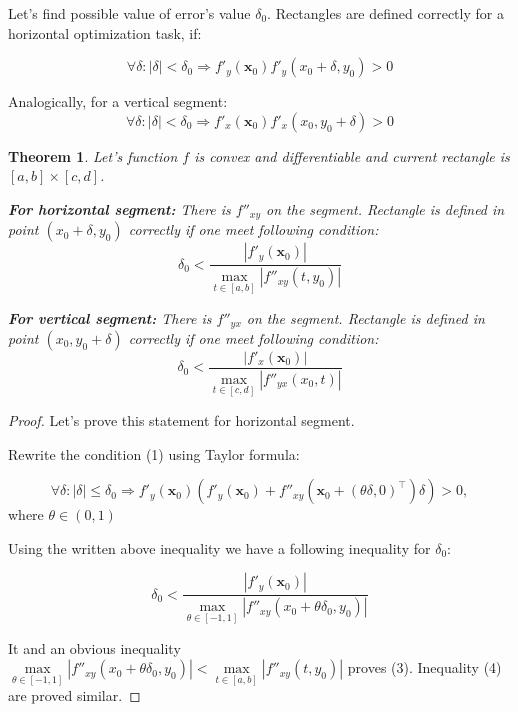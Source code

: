 \documentclass[12pt]{article}
\newtheorem{theorem}{Theorem}[section]
\begin{document}
Let's find possible value of error's value $\delta_0$. Rectangles are defined correctly for a horizontal optimization task, if:

\begin{equation}\label{1}
\forall\delta : |\delta| < \delta_0 \Rightarrow f'_y(\textbf{x}_0)f'_y(x_0+\delta, y_0) > 0
\end{equation}

Analogically, for a vertical segment:
\begin{equation}
\forall\delta: |\delta| < \delta_0 \Rightarrow f'_x(\textbf{x}_0)f'_x(x_0, y_0+\delta) > 0
\end{equation}


\begin{theorem}
Let's function $f$ is convex and differentiable and current rectangle is $[a,b]\times[c,d]$.

\textbf{For horizontal segment:}  There is $f''_{xy}$ on the segment. Rectangle is defined in point $(x_0 + \delta, y_0)$ correctly if one meet following condition:
\begin{equation}
\delta_0 < \frac{|f'_y(\textbf{x}_0)|}{\max\limits_{t\in [a,b]}|f''_{xy}(t, y_0)|}
\end{equation}

\textbf{For vertical segment:}  There is $f''_{yx}$ on the segment. Rectangle is defined in point $(x_0, y_0+\delta)$ correctly if one meet following condition:
\begin{equation}
\delta_0 < \frac{|f'_x(\textbf{x}_0)|}{\max\limits_{t\in [c,d]}|f''_{yx}(x_0, t)|}
\end{equation}

\end{theorem}
\begin{proof}

Let's prove this statement for horizontal segment.

Rewrite the condition (1) using Taylor formula:

$$\forall \delta:|\delta|\leq\delta_0\Rightarrow f'_y(\textbf{x}_0)\left(f'_y(\textbf{x}_0)+f''_{xy}\left(\textbf{x}_0+(\theta\delta,0)^\top\right)\delta\right) > 0,$$
where $\theta\in(0,1)$

Using the written above inequality we have a following inequality for $\delta_0$:

$$\delta_0<\frac{|f'_y(\textbf{x}_0)|}{\max\limits_{\theta \in [-1, 1]}|f''_{xy}(x_0 + \theta\delta_0, y_0)|}$$

It and an obvious inequality $\max\limits_{\theta \in [-1, 1]}|f''_{xy}(x_0 + \theta\delta_0, y_0)| < \max\limits_{t\in [a,b]}|f''_{xy}(t, y_0)|$ proves (3). Inequality (4) are proved similar.
\end{proof}
\end{document}
